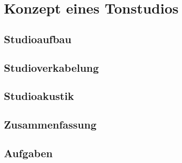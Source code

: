 \chapter{Konzept eines Tonstudios}
\thispagestyle{empty}

\section{Studioaufbau}

\section{Studioverkabelung}

\section{Studioakustik}

\section{Zusammenfassung}

\section{Aufgaben}




\newpage
\thispagestyle{empty}
